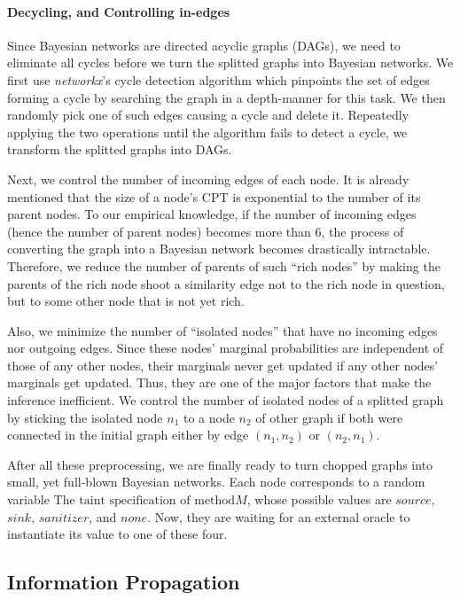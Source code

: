 \paragraph{Decycling, and Controlling in-edges}

Since Bayesian networks are directed acyclic graphs (DAGs), we need to eliminate
all cycles before we turn the splitted graphs into Bayesian networks. We first
use \emph{networkx}'s cycle
detection algorithm which pinpoints the set of edges forming a cycle by
searching the graph in a depth-manner for this task. We then randomly pick one of
such edges causing a cycle and delete it. Repeatedly applying the two
operations until the algorithm fails to detect a cycle, we transform the
splitted graphs into DAGs.

Next, we control the number of incoming edges of each node. It is already
mentioned that the size of a node's CPT is exponential to the number of its
parent nodes. To our empirical knowledge, if the number of incoming edges (hence
the number of parent nodes) becomes more than 6, the process of converting the
graph into a Bayesian network becomes drastically intractable. Therefore, we
reduce the number of parents of such ``rich nodes'' by making the parents of the
rich node shoot a similarity edge not to the rich node in question, but to some
other node that is not yet rich.

Also, we minimize the number of ``isolated nodes'' that have no incoming edges
nor outgoing edges. Since these nodes' marginal probabilities are independent of
those of any other nodes, their marginals never get updated if any other nodes'
marginals get updated. Thus, they are one of the major factors that make the
inference inefficient. We control the number of isolated nodes of a splitted
graph by sticking the isolated node $n_1$ to a node $n_2$ of other graph if both
were connected in the initial graph either by edge $(n_1, n_2)$ or $(n_2, n_1)$. 

After all these preprocessing, we are finally ready to turn chopped graphs into
small, yet full-blown Bayesian networks. Each node corresponds to a random
variable $\text{The taint specification of method} M$, whose possible values are
$source$, $sink$, $sanitizer$, and $none$. Now, they are waiting for an external
oracle to instantiate its value to one of these four.

\subsection{Information Propagation}

